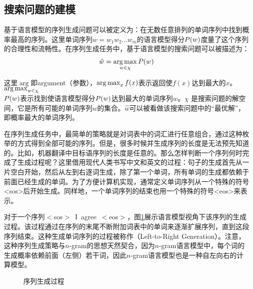 
\subsection{搜索问题的建模}

\parinterval 基于语言模型的序列生成问题可以被定义为：在无数任意排列的单词序列中找到概率最高的序列。这里单词序列$w = w_1 w_2 \ldots w_m$的语言模型得分${P}(w)$度量了这个序列的合理性和流畅性。在序列生成任务中，基于语言模型的搜索问题可以被描述为：
\begin{eqnarray}
\hat{w} = \operatorname*{arg\,max}_{w \in \chi}{P}(w)
\label{eq:2-42}
\end{eqnarray}

\noindent 这里$\arg$即argument（参数），$\operatorname*{arg\,max}_x f(x)$表示返回使$f(x)$达到最大的$x$。$\operatorname*{arg\,max}_{w \in \chi}$\\${P}(w)$表示找到使语言模型得分${P}(w)$达到最大的单词序列$w$。$\chi$ 是搜索问题的解空间，它是所有可能的单词序列$w$的集合。$\hat{w}$可以被看做该搜索问题中的“最优解”，即概率最大的单词序列。

\parinterval 在序列生成任务中，最简单的策略就是对词表中的词汇进行任意组合，通过这种枚举的方式得到全部可能的序列。但是，很多时候并生成序列的长度是无法预先知道的。比如，机器翻译中目标语序列的长度是任意的。那么怎样判断一个序列何时完成了生成过程呢？这里借用现代人类书写中文和英文的过程：句子的生成首先从一片空白开始，然后从左到右逐词生成，除了第一个单词，所有单词的生成都依赖于前面已经生成的单词。为了方便计算机实现，通常定义单词序列从一个特殊的符号<sos>后开始生成。同样地，一个单词序列的结束也用一个特殊的符号<eos>来表示。

\parinterval 对于一个序列$<$sos$>$\ I\ agree\ $<$eos$>$，图\ref{fig:2-13}展示语言模型视角下该序列的生成过程。该过程通过在序列的末尾不断附加词表中的单词来逐渐扩展序列，直到这段序列结束。这种生成单词序列的过程被称作{\small{}}（Left-to-Right Generation）。注意，这种序列生成策略与$n$-gram的思想天然契合，因为$n$-gram语言模型中，每个词的生成概率依赖前面（左侧）若干词，因此$n$-gram语言模型也是一种自左向右的计算模型。

\vspace{-0.5em}
\begin{figure}[htp]
    \centering
 	
	\caption{序列生成过程}
    \label{fig:2-13}
\end{figure}
\vspace{-0.5em}

